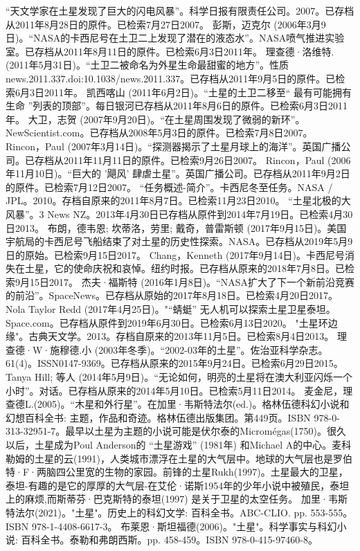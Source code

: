 \begin{enumerate}
 “天文学家在土星发现了巨大的闪电风暴”。科学日报有限责任公司。2007。已存档从2011年8月28日的原件。已检索7月27日2007。
 彭斯，迈克尔 (2006年3月9日)。“NASA的卡西尼号在土卫二上发现了潜在的液态水”。NASA喷气推进实验室。已存档从2011年8月11日的原件。已检索6月3日2011年。
 理查德·洛维特.(2011年5月31日)。“土卫二被命名为外星生命最甜蜜的地方”。性质news.2011.337.doi:10.1038/news.2011.337。已存档从2011年9月5日的原件。已检索6月3日2011年。
 凯西喀山 (2011年6月2日)。“土星的土卫二移至“ 最有可能拥有生命 ”列表的顶部”。每日银河已存档从2011年8月6日的原件。已检索6月3日2011年。
 大卫，志贺 (2007年9月20日)。“在土星周围发现了微弱的新环”。NewScientist.com。已存档从2008年5月3日的原件。已检索7月8日2007。
 Rincon，Paul (2007年3月14日)。“探测器揭示了土星月球上的海洋”。英国广播公司。已存档从2011年11月11日的原件。已检索9月26日2007。
 Rincon，Paul (2006年11月10日)。“巨大的 '飓风' 肆虐土星”。英国广播公司。已存档从2011年9月2日的原件。已检索7月12日2007。
 “任务概述-简介”。卡西尼冬至任务。NASA / JPL。2010。存档自原来的2011年8月7日。已检索11月23日2010。
 “土星北极的大风暴”。3 News NZ。2013年4月30日已存档从原件到2014年7月19日。已检索4月30日2013。
 布朗，德韦恩; 坎蒂洛，劳里; 戴奇，普雷斯顿 (2017年9月15日)。美国宇航局的卡西尼号飞船结束了对土星的历史性探索。NASA。已存档从2019年5月9日的原始。已检索9月15日2017。
 Chang，Kenneth (2017年9月14日)。卡西尼号消失在土星，它的使命庆祝和哀悼。纽约时报。已存档从原来的2018年7月8日。已检索9月15日2017。
 杰夫·福斯特 (2016年1月8日)。“NASA扩大了下一个新前沿竞赛的前沿”。SpaceNews。已存档从原始的2017年8月18日。已检索4月20日2017。
 Nola Taylor Redd (2017年4月25日)。"“蜻蜓” 无人机可以探索土星卫星泰坦。Space.com。已存档从原件到2019年6月30日。已检索6月13日2020。
 "土星环边缘"。古典天文学。2013。存档自原来的2013年11月5日。已检索8月4日2013。
 理查德·W·施穆德.小 (2003年冬季)。“2002-03年的土星”。佐治亚科学杂志。61(4)。ISSN0147-9369。已存档从原来的2015年9月24日。已检索6月29日2015。 
 Tanya Hill; 等人 (2014年5月9日)。“无论如何，明亮的土星将在澳大利亚闪烁一个小时”。对话。已存档从原来的2014年5月10日。已检索5月11日2014。
 麦金尼，理查德L.(2005)。“木星和外行星”。在加里·韦斯特法尔(ed.)。格林伍德科幻小说和幻想百科全书: 主题，作品和奇迹。格林伍德出版集团。第449页。ISBN 978-0-313-32951-7。最早以土星为主题的小说可能是伏尔泰的Micromégas(1750)。很久以后，土星成为Poul Anderson的 “土星游戏” (1981年) 和Michael A的中心。麦科勒姆的土星的云(1991)，人类城市漂浮在土星的大气层中。地球的大气层也是罗伯特·F·两脑四公里宽的生物的家园。前锋的土星Rukh(1997)。土星最大的卫星，泰坦-有趣的是它的厚厚的大气层-在艾伦·诺斯1954年的少年小说中被殖民，泰坦上的麻烦,而斯蒂芬·巴克斯特的泰坦(1997) 是关于卫星的太空任务。
 加里·韦斯特法尔(2021)。"土星"。历史上的科幻文学: 百科全书。ABC-CLIO. pp. 553-555。ISBN 978-1-4408-6617-3。
 布莱恩·斯坦福德(2006)。"土星"。科学事实与科幻小说: 百科全书。泰勒和弗朗西斯。pp. 458-459。ISBN 978-0-415-97460-8。
\end{enumerate}










